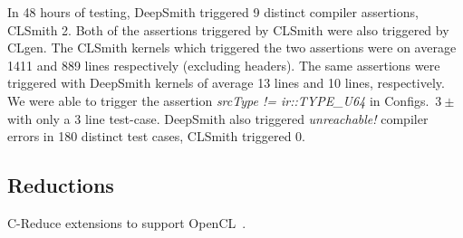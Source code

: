 In 48 hours of testing, DeepSmith triggered 9 distinct compiler assertions, CLSmith 2. Both of the assertions triggered by CLSmith were also triggered by CLgen.
%
%
%
The CLSmith kernels which triggered the two assertions were on average 1411 and 889 lines respectively (excluding headers). The same assertions were triggered with DeepSmith kernels of average 13 lines and 10 lines, respectively. 
%
We were able to trigger the assertion \emph{srcType != ir::TYPE\_U64} in Configs.\ $3\pm$ with only a 3 line test-case.
%
DeepSmith also triggered \emph{unreachable!} compiler errors in 180 distinct test cases, CLSmith triggered 0.



\subsection{Reductions}

C-Reduce extensions to support OpenCL~\cite{Pflanzer2016}.


